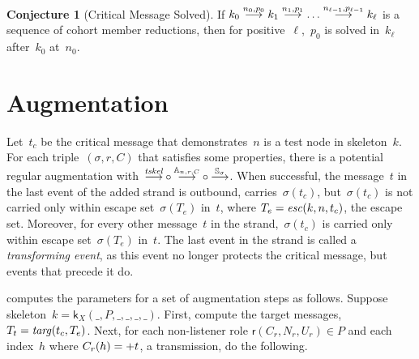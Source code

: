 \documentclass[12pt]{report}
\theoremstyle{definition}
\newtheorem{conj}[thm]{Conjecture}
\newcommand{\role}{\mathsf{r}}
\newcommand{\skel}{\mathsf{k}}
\begin{document}
\begin{conj}[Critical Message Solved]
If $k_0\stackrel{n_0,p_0}{\longrightarrow}k_1 \stackrel{n_1,p_1}{\longrightarrow}\ldots
\stackrel{n_{\ell-1},p_{\ell-1}}{\longrightarrow}k_\ell$ is a sequence of cohort member
reductions, then for positive~$\ell$,~$p_0$ is solved in~$k_\ell$
after~$k_0$ at~$n_0$.
\end{conj}

\section{Augmentation}\label{sec:augmentation}

Let~$t_c$ be the critical message that demonstrates~$n$ is a test node
in skeleton~$k$.  For each triple~$(\sigma,r,C)$ that satisfies some
properties, there is a potential regular augmentation
with~$\comp{\reduction{\fn{tskel}}}%
{\comp{\reduction{\ops{A}_{n,r,C}}}{\reduction{\ops{S}_\sigma}}}$.
When successful, the message~$t$ in the last event of the added strand
is outbound, carries~$\sigma(t_c)$, but~$\sigma(t_c)$ is not carried
only within escape set~$\sigma(T_e)$ in~$t$, where
$T_e=\operatorname{\mathit{esc}}(k,n,t_c)$, the escape set.  Moreover, for every other
message~$t$ in the strand,~$\sigma(t_c)$ is carried only within escape
set~$\sigma(T_e)$ in~$t$.  The last event in the strand is called a
\emph{transforming event}, as this event no
longer protects the critical message, but events that precede it do.

{\cpsa} computes the parameters for a set of augmentation steps as
follows.  Suppose skeleton~$k=\skel_X(\_,P,\_,\_,\_,\_)$.  First,
compute the target messages, $T_t=\operatorname{\mathit{targ}}(t_c, T_e)$.  Next, for
each non-listener role $\role(C_r,N_r,U_r)\in P$ and each index~$h$ where
$C_r(h)=\mathord + t$, a transmission, do the following.
\end{document}
